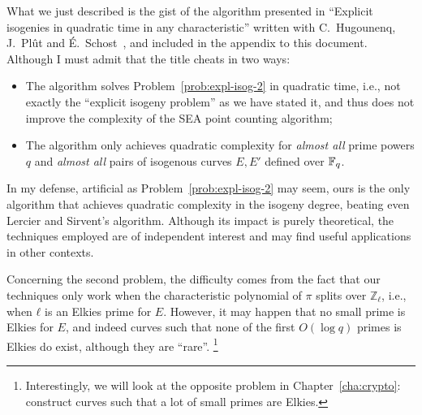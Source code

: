 \documentclass{report}
\theoremstyle{plain}
\theoremstyle{definition}
\begin{document}
What we just described is the gist of the algorithm presented in
``Explicit isogenies in quadratic time in any characteristic'' written
with C.~Hugounenq, J.~Plût and É.~Schost~\cite{defeo2016explicit}, and included
in the appendix to this document. %
Although I must admit that the title cheats in two ways:
\begin{itemize}
\item The algorithm solves Problem~\ref{prob:expl-isog-2} in quadratic
  time, i.e., not exactly the ``explicit isogeny problem'' as we have
  stated it, and thus does not improve the complexity of the SEA point
  counting algorithm;
\item The algorithm only achieves quadratic complexity for
  \emph{almost all} prime powers $q$ and \emph{almost all} pairs of
  isogenous curves $E,E'$ defined over $\mathbb{F}_q$. %
\end{itemize}

In my defense, artificial as Problem~\ref{prob:expl-isog-2} may seem,
ours is the only algorithm that achieves quadratic complexity in the
isogeny degree, beating even Lercier and Sirvent's algorithm. %
Although its impact is purely theoretical, the techniques employed are
of independent interest and may find useful applications in other
contexts. %

Concerning the second problem, the difficulty comes from the fact that
our techniques only work when the characteristic polynomial of $π$
splits over $ℤ_ℓ$, i.e., when $ℓ$ is an Elkies prime for $E$. %
However, it may happen that no small prime is Elkies for $E$, and
indeed curves such that none of the first $O(\log q)$ primes is Elkies
do exist, although they are ``rare''.%
\footnote{Interestingly, we will look at the opposite problem in
  Chapter~\ref{cha:crypto}: construct curves such that a lot of small
  primes are Elkies.} %
\end{document}
